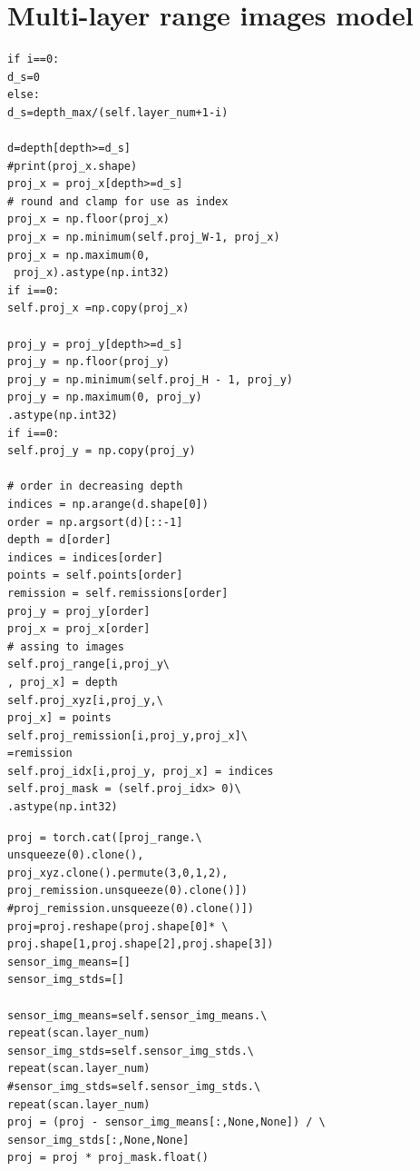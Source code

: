 \documentclass[final]{cvpr}
\begin{document}
\appendix  
\section{Multi-layer range images model}
\begin{lstlisting}
if i==0:
d_s=0
else:
d_s=depth_max/(self.layer_num+1-i)

d=depth[depth>=d_s]
#print(proj_x.shape)
proj_x = proj_x[depth>=d_s]
# round and clamp for use as index
proj_x = np.floor(proj_x)
proj_x = np.minimum(self.proj_W-1, proj_x)
proj_x = np.maximum(0,
 proj_x).astype(np.int32)
if i==0:
self.proj_x =np.copy(proj_x)

proj_y = proj_y[depth>=d_s]
proj_y = np.floor(proj_y)
proj_y = np.minimum(self.proj_H - 1, proj_y)
proj_y = np.maximum(0, proj_y)
.astype(np.int32)
if i==0:
self.proj_y = np.copy(proj_y)

# order in decreasing depth
indices = np.arange(d.shape[0])
order = np.argsort(d)[::-1]
depth = d[order]
indices = indices[order]
points = self.points[order]
remission = self.remissions[order]
proj_y = proj_y[order]
proj_x = proj_x[order]
# assing to images
self.proj_range[i,proj_y\
, proj_x] = depth
self.proj_xyz[i,proj_y,\
proj_x] = points
self.proj_remission[i,proj_y,proj_x]\
=remission
self.proj_idx[i,proj_y, proj_x] = indices
self.proj_mask = (self.proj_idx> 0)\
.astype(np.int32)
\end{lstlisting}
\begin{lstlisting}
proj = torch.cat([proj_range.\
unsqueeze(0).clone(),
proj_xyz.clone().permute(3,0,1,2),
proj_remission.unsqueeze(0).clone()])
#proj_remission.unsqueeze(0).clone()])
proj=proj.reshape(proj.shape[0]* \
proj.shape[1,proj.shape[2],proj.shape[3])
sensor_img_means=[]
sensor_img_stds=[]

sensor_img_means=self.sensor_img_means.\
repeat(scan.layer_num)
sensor_img_stds=self.sensor_img_stds.\
repeat(scan.layer_num)
#sensor_img_stds=self.sensor_img_stds.\
repeat(scan.layer_num)
proj = (proj - sensor_img_means[:,None,None]) / \
sensor_img_stds[:,None,None]
proj = proj * proj_mask.float()
\end{lstlisting}
\end{document}
